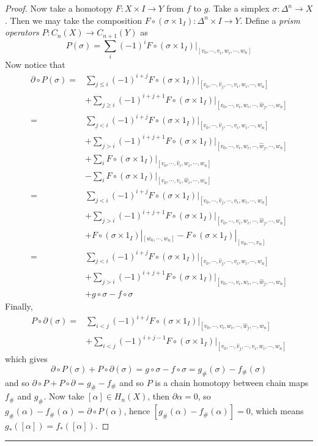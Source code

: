 \begin{proof}
Now take a homotopy $F:X\times I\rightarrow Y$ from $f$ to $g$. Take a simplex $\sigma:\Delta^n\rightarrow X$. Then we may take the composition $F\circ (\sigma\times 1_{I}):\Delta^n\times I\rightarrow Y$. Define a \textit{prism operators} $P:C_n(X)\rightarrow C_{n+1}(Y)$ as
\begin{equation}
P(\sigma)=\sum_i (-1)^i F\circ (\sigma\times 1_I)|_{[v_0,\cdots,v_i,w_i,\cdots,w_n]}
\end{equation}
Now notice that
\begin{align*}
\partial\circ P(\sigma)=&\sum_{j\leq i}(-1)^{i+j}F\circ (\sigma\times 1_I)|_{[v_0,\cdots,\hat{v}_j,\cdots,v_i,w_i,\cdots,w_n]}\\
&+\sum_{j\geq i}(-1)^{i+j+1}F\circ (\sigma\times 1_I)|_{[v_0,\cdots,v_i,w_i,\cdots,\hat{w}_j,\cdots,w_n]}\\
=&\sum_{j<i}(-1)^{i+j}F\circ (\sigma\times 1_I)|_{[v_0,\cdots,\hat{v}_j,\cdots,v_i,w_i,\cdots,w_n]}\\
&+\sum_{j> i}(-1)^{i+j+1}F\circ (\sigma\times 1_I)|_{[v_0,\cdots,v_i,w_i,\cdots,\hat{w}_j,\cdots,w_n]}\\
&+\sum_{i}F\circ(\sigma\times 1_I)|_{[v_0,\cdots,\hat{v}_i,w_i,\cdots,w_n]}\\
&-\sum_{i}F\circ(\sigma\times 1_I)|_{[v_0,\cdots,v_i,\hat{w}_i,\cdots,w_n]}\\
=&\sum_{j<i}(-1)^{i+j}F\circ (\sigma\times 1_I)|_{[v_0,\cdots,\hat{v}_j,\cdots,v_i,w_i,\cdots,w_n]}\\
&+\sum_{j> i}(-1)^{i+j+1}F\circ (\sigma\times 1_I)|_{[v_0,\cdots,v_i,w_i,\cdots,\hat{w}_j,\cdots,w_n]}\\
&+F\circ (\sigma\times 1_I)|_{[w_0,\cdots,w_n]}-F\circ(\sigma\times 1_I)|_{[v_0,\cdots,v_n]}\\
=&\sum_{j<i}(-1)^{i+j}F\circ (\sigma\times 1_I)|_{[v_0,\cdots,\hat{v}_j,\cdots,v_i,w_i,\cdots,w_n]}\\
&+\sum_{j> i}(-1)^{i+j+1}F\circ (\sigma\times 1_I)|_{[v_0,\cdots,v_i,w_i,\cdots,\hat{w}_j,\cdots,w_n]}\\
&+g\circ \sigma-f\circ \sigma
\end{align*}
Finally,
\begin{equation}
\begin{split}
P\circ \partial(\sigma)=&\sum_{i<j}(-1)^{i+j}F\circ(\sigma\times 1_I)|_{[v_0,\cdots,v_i,w_i,\cdots,\hat{w}_j,\cdots,w_n]}\\
&+\sum_{i<j}(-1)^{i+j-1}F\circ(\sigma\times 1_I)|_{[v_0,\cdots,\hat{v}_j,\cdots,v_i,w_i,\cdots,w_n]}
\end{split}
\end{equation}
which gives
\begin{equation}
\partial\circ P(\sigma)+P\circ \partial(\sigma)=g\circ \sigma-f\circ \sigma=g_\#(\sigma)-f_\#(\sigma)
\end{equation}
and so $\partial\circ P+P\circ \partial=g_\#-f_\#$ and so $P$ is a chain homotopy between chain maps $f_\#$ and $g_\#$. Now take $[\alpha]\in H_n(X)$, then $\partial\alpha=0$, so $g_\#(\alpha)-f_\#(\alpha)=\partial\circ P(\alpha)$, hence $[g_\#(\alpha)-f_\#(\alpha)]=0$, which means $g_*([\alpha])=f_*([\alpha])$.
\end{proof}

\noindent\rule{\textwidth}{1pt}
\newline